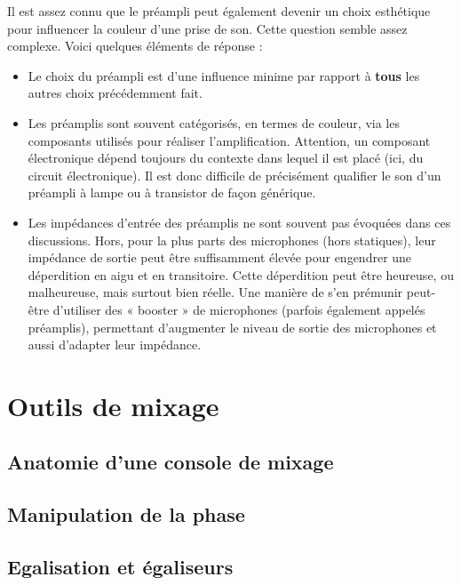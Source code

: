 \documentclass[
  letterpaper,
  DIV=11,
  numbers=noendperiod]{scrreprt}
\providecommand{\tightlist}{%
  \setlength{\itemsep}{0pt}\setlength{\parskip}{0pt}}\usepackage{longtable,booktabs,array}
\begin{document}
Il est assez connu que le préampli peut également devenir un choix
esthétique pour influencer la couleur d'une prise de son. Cette question
semble assez complexe. Voici quelques éléments de réponse :

\begin{itemize}
\tightlist
\item
  Le choix du préampli est d'une influence minime par rapport à
  \textbf{tous} les autres choix précédemment fait.
\item
  Les préamplis sont souvent catégorisés, en termes de couleur, via les
  composants utilisés pour réaliser l'amplification. Attention, un
  composant électronique dépend toujours du contexte dans lequel il est
  placé (ici, du circuit électronique). Il est donc difficile de
  précisément qualifier le son d'un préampli à lampe ou à transistor de
  façon générique.
\item
  Les impédances d'entrée des préamplis ne sont souvent pas évoquées
  dans ces discussions. Hors, pour la plus parts des microphones (hors
  statiques), leur impédance de sortie peut être suffisamment élevée
  pour engendrer une déperdition en aigu et en transitoire. Cette
  déperdition peut être heureuse, ou malheureuse, mais surtout bien
  réelle. Une manière de s'en prémunir peut-être d'utiliser des «
  booster » de microphones (parfois également appelés préamplis),
  permettant d'augmenter le niveau de sortie des microphones et aussi
  d'adapter leur impédance.
\end{itemize}

\part{Outils de mixage}

\hypertarget{anatomie-dune-console-de-mixage}{%
\chapter{Anatomie d'une console de
mixage}\label{anatomie-dune-console-de-mixage}}

\hypertarget{manipulation-de-la-phase}{%
\chapter{Manipulation de la phase}\label{manipulation-de-la-phase}}

\hypertarget{egalisation-et-uxe9galiseurs}{%
\chapter{Egalisation et égaliseurs}\label{egalisation-et-uxe9galiseurs}}
\end{document}
